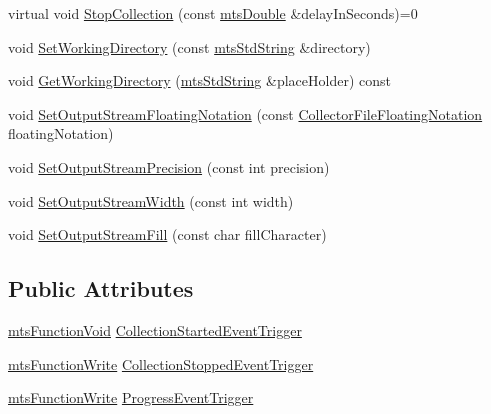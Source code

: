 \begin{DoxyCompactItemize}
\item 
virtual void \hyperlink{classmts_collector_base_a56f67fc120a7088b8d5904a3a785d5dd}{Stop\+Collection} (const \hyperlink{mts_generic_object_proxy_8h_a31e76b0190a8d3f9838626cd7b47bd75}{mts\+Double} \&delay\+In\+Seconds)=0
\item 
void \hyperlink{classmts_collector_base_a6983e4ef85748d0f898f69975147d0c2}{Set\+Working\+Directory} (const \hyperlink{mts_generic_object_proxy_8h_adbc21bfbf98367e582bf8a263b7e711f}{mts\+Std\+String} \&directory)
\item 
void \hyperlink{classmts_collector_base_ac53feb248d3ebd8056f7454855c1aba3}{Get\+Working\+Directory} (\hyperlink{mts_generic_object_proxy_8h_adbc21bfbf98367e582bf8a263b7e711f}{mts\+Std\+String} \&place\+Holder) const 
\item 
void \hyperlink{classmts_collector_base_a2d1f0135da1bdfcf964adf5add3848b1}{Set\+Output\+Stream\+Floating\+Notation} (const \hyperlink{group__cisst_multi_task_gad5d486fde9f8105e4de551d00026ea93}{Collector\+File\+Floating\+Notation} floating\+Notation)
\item 
void \hyperlink{classmts_collector_base_a0d118b2d074a7466b6b659a16dc4612c}{Set\+Output\+Stream\+Precision} (const int precision)
\item 
void \hyperlink{classmts_collector_base_a8ae87596c1de63ee54ffade9e21f35ad}{Set\+Output\+Stream\+Width} (const int width)
\item 
void \hyperlink{classmts_collector_base_a9e207050f00ef0132348e6f2321a451a}{Set\+Output\+Stream\+Fill} (const char fill\+Character)
\end{DoxyCompactItemize}
\subsection*{Public Attributes}
\begin{DoxyCompactItemize}
\item 
\hyperlink{classmts_function_void}{mts\+Function\+Void} \hyperlink{classmts_collector_base_aad959016aa62b9f20980c7cb61ccba8a}{Collection\+Started\+Event\+Trigger}
\item 
\hyperlink{classmts_function_write}{mts\+Function\+Write} \hyperlink{classmts_collector_base_a8caa04305488581107b1ad19087079a2}{Collection\+Stopped\+Event\+Trigger}
\item 
\hyperlink{classmts_function_write}{mts\+Function\+Write} \hyperlink{classmts_collector_base_a038835b577383fbc4b437ff60563b55b}{Progress\+Event\+Trigger}
\end{DoxyCompactItemize}
